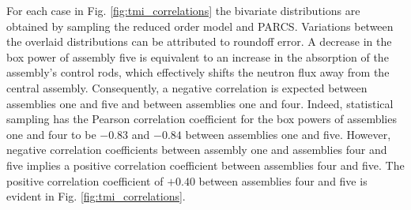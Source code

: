 For each case in Fig. \ref{fig:tmi_correlations} the bivariate distributions are obtained by sampling the reduced order model and \ac{PARCS}. Variations between the overlaid distributions can be attributed to roundoff error. A decrease in the box power of assembly five is equivalent to an increase in the absorption of the assembly's control rods, which effectively shifts the neutron flux away from the central assembly. Consequently, a negative correlation is expected between assemblies one and five and between assemblies one and four. Indeed, statistical sampling has the Pearson correlation coefficient for the box powers of assemblies one and four to be $-0.83$ and $-0.84$ between assemblies one and five. However, negative correlation coefficients between assembly one and assemblies four and five implies a positive correlation coefficient between assemblies four and five. The positive correlation coefficient of $+0.40$ between assemblies four and five is evident in Fig. \ref{fig:tmi_correlations}.  

